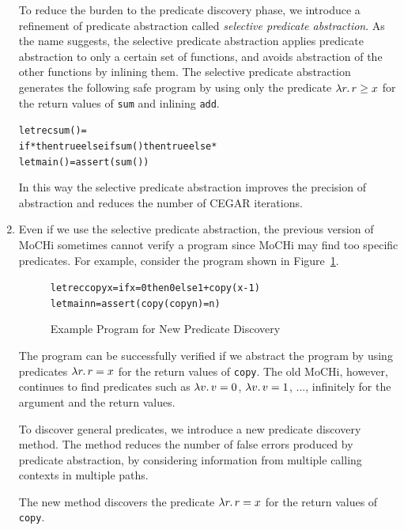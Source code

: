 \begin{enumerate}
      To reduce the burden to the predicate discovery phase, we introduce
      a refinement of predicate abstraction called \emph{selective
      predicate abstraction}.  As the name suggests, the selective
      predicate abstraction applies predicate abstraction to only a
      certain set of functions, and avoids abstraction of the other
      functions by inlining them.  The selective predicate abstraction
      generates the following safe program by using only the
      predicate $\lambda{r}.\,{r \geq x}$ for the return values of \texttt{sum}
      and inlining \texttt{add}.
\begin{alltt}
let rec sum () =
  if * then true else if sum () then true else *
let main () = assert (sum ())
\end{alltt}
      In this way the selective predicate abstraction improves the
      precision of abstraction and reduces the number of CEGAR iterations.

\item Even if we use the selective predicate abstraction, the previous
      version of MoCHi sometimes cannot verify a program since MoCHi may
      find too specific predicates.  For example, consider the program
      shown in Figure~\ref{fig:copy}.
\begin{figure}[t]
\begin{alltt}
let rec copy x = if x=0 then 0 else 1 + copy (x-1)
let main n = assert (copy (copy n) = n)
\end{alltt}
\caption{Example Program for New Predicate Discovery}
\label{fig:copy}
\end{figure}
      The program can be successfully verified if we abstract the
      program by using predicates $\lambda{r}.\,{r = x}$ for the return values
      of \texttt{copy}.  The old MoCHi, however, continues to find
      predicates such as $\lambda{v}.\,{v = 0}$, $\lambda{v}.\,{v = 1}$, ...,
      infinitely for the argument and the return values.

      To discover general predicates, we introduce a new predicate
      discovery method.  The method reduces the number of false errors
      produced by predicate abstraction, by considering information from
      multiple calling contexts in multiple paths.

      The new method discovers the predicate $\lambda{r}.\,{r = x}$ for the
      return values of \texttt{copy}.


\end{enumerate}
